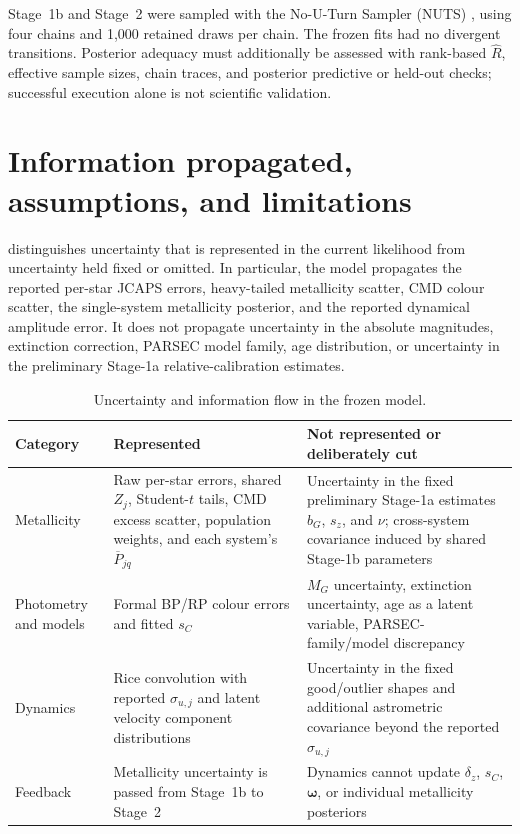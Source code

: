 Stage~1b and Stage~2 were sampled with the No-U-Turn Sampler (NUTS)
\citep{HoffmanGelman2014NUTS}, using four chains and 1,000 retained draws per
chain.  The frozen fits had no divergent transitions.  Posterior adequacy must
additionally be assessed with rank-based
$\widehat R$, effective sample sizes, chain traces, and posterior predictive or
held-out checks; successful execution alone is not scientific validation.

\section{Information propagated, assumptions, and limitations}
\label{sec:limitations}

 distinguishes uncertainty that is represented in the
current likelihood from uncertainty held fixed or omitted.  In particular, the
model propagates the reported per-star JCAPS errors, heavy-tailed metallicity
scatter, CMD colour scatter, the single-system metallicity posterior, and the
reported dynamical amplitude error.  It does not propagate uncertainty in the
absolute magnitudes, extinction correction, PARSEC model family, age
distribution, or uncertainty in the preliminary Stage-1a relative-calibration
estimates.

\begin{table}[htbp]
\centering
\caption{Uncertainty and information flow in the frozen model.}
\label{tab:uncertainties}
\begin{tabularx}{\textwidth}{@{}lXX@{}}
\toprule
Category & Represented & Not represented or deliberately cut \\
\midrule
Metallicity & Raw per-star errors, shared $Z_j$, Student-$t$ tails,
CMD excess scatter, population weights, and each system's $\overline P_{jq}$
& Uncertainty in the fixed preliminary Stage-1a estimates $b_G$, $s_z$, and
$\nu$; cross-system covariance induced by shared Stage-1b parameters \\
Photometry and models & Formal BP/RP colour errors and fitted $s_C$
& $M_G$ uncertainty, extinction uncertainty, age as a latent variable,
PARSEC-family/model discrepancy \\
Dynamics & Rice convolution with reported $\sigma_{u,j}$ and latent velocity
component distributions & Uncertainty in the fixed good/outlier shapes and
additional astrometric covariance beyond the reported $\sigma_{u,j}$ \\
Feedback & Metallicity uncertainty is passed from Stage~1b to Stage~2
& Dynamics cannot update $\delta_z$, $s_C$, $\bm\omega$, or individual
metallicity posteriors \\
\bottomrule
\end{tabularx}
\end{table}

